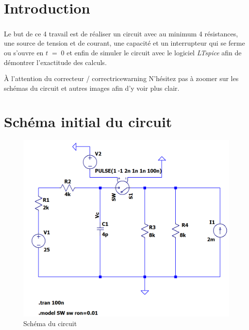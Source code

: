 \section{Introduction}

    \subparagraph{}Le but de ce {\color{info}4\ieme{} travail} est de réaliser un circuit avec au minimum 4 résistances,
    une source de tension et de courant, une capacité et un interrupteur qui se ferme ou s'ouvre en $t\; =\; 0$ et enfin
    de simuler le circuit avec le logiciel \textit{LTspice} afin de démontrer l'exactitude des calculs.\\[1.5cm]
    
    \begin{titletbox}{À l'attention du correcteur / correctrice}{warning}
        N'hésitez pas à zoomer sur les schémas du circuit et autres images afin d'y voir plus clair.
    \end{titletbox}

\section{Schéma initial du circuit}

    \begin{figure}[H]
        \centering
        \includegraphics[scale=0.5]{../pictures/circuit.png} %
        \caption{Schéma du circuit}
    \end{figure}

